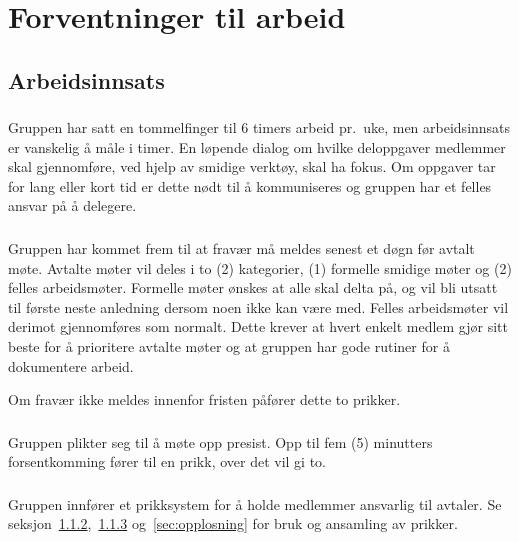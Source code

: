\documentclass[11pt]{article}
\begin{document}
	\section{Forventninger til arbeid}
	\subsection{Arbeidsinnsats}
	\subsubsection{}
	\label{subsec:arbiedsinnsats}
	Gruppen har satt en tommelfinger til 6 timers arbeid pr.~uke, men arbeidsinnsats er vanskelig å måle i timer. En løpende dialog om hvilke deloppgaver medlemmer skal gjennomføre, ved hjelp av smidige verktøy, skal ha fokus. Om oppgaver tar for lang eller kort tid er dette nødt til å kommuniseres og gruppen har et felles ansvar på å delegere. 
	
	\subsubsection{}
	\label{subsec:fravar}
	Gruppen har kommet frem til at fravær må meldes senest et døgn før avtalt møte. Avtalte møter vil deles i to (2) kategorier, (1) formelle smidige møter og (2) felles arbeidsmøter. Formelle møter ønskes at alle skal delta på, og vil bli utsatt til første neste anledning dersom noen ikke kan være med. Felles arbeidsmøter vil derimot gjennomføres som normalt. Dette krever at hvert enkelt medlem gjør sitt beste for å prioritere avtalte møter og at gruppen har gode rutiner for å dokumentere arbeid.
	
	Om fravær ikke meldes innenfor fristen påfører dette to prikker.
	
	\subsubsection{}
	\label{subsec:forsent}
	Gruppen plikter seg til å møte opp presist. Opp til fem (5) minutters forsentkomming fører til en prikk, over det vil gi to.
	
	\subsubsection{}
	\label{sec:prikker}
	Gruppen innfører et prikksystem for å holde medlemmer ansvarlig til avtaler. Se seksjon~\ref{subsec:fravar},~\ref{subsec:forsent} og~\ref{sec:opplosning} for bruk og ansamling av prikker.
	
\end{document}
